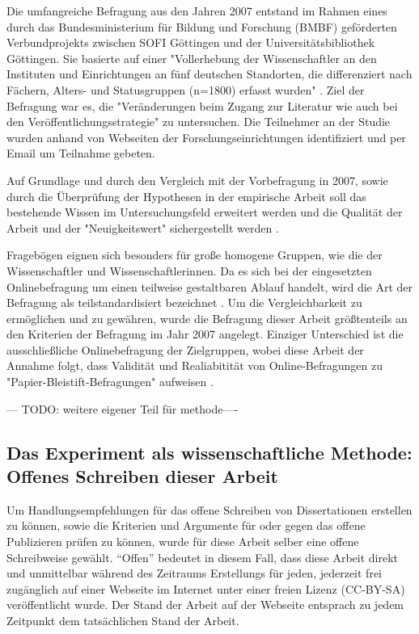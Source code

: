 Die umfangreiche Befragung aus den Jahren 2007 entstand im Rahmen eines durch das Bundesministerium für Bildung und Forschung (BMBF) geförderten Verbundprojekts zwischen SOFI Göttingen und der Universitätsbibliothek Göttingen. Sie basierte auf einer "Vollerhebung der Wissenschaftler an den Instituten und Einrichtungen an fünf deutschen Standorten, die differenziert nach Fächern, Alters- und Statusgruppen (n=1800) erfasst wurden" \cite{Hanekop_2014}. Ziel der Befragung war es, die "Veränderungen beim Zugang zur Literatur wie auch bei den Veröffentlichungsstrategie" \cite{Hanekop_Wittke_2007_Fragebogen} zu untersuchen. Die Teilnehmer an der Studie wurden anhand von Webseiten der Forschungseinrichtungen identifiziert und per Email um Teilnahme gebeten.

Auf Grundlage und durch den Vergleich mit der Vorbefragung in 2007, sowie durch die Überprüfung der Hypothesen in der empirische Arbeit soll das bestehende Wissen im Untersuchungsfeld erweitert werden und die Qualität der Arbeit und der "Neuigkeitswert" sichergestellt werden \cite{raab_2012_fragebogen}.

Fragebögen eignen sich besonders für große homogene Gruppen, wie die der Wissenschaftler und Wissenschaftlerinnen. Da es sich bei der eingesetzten Onlinebefragung um einen teilweise gestaltbaren Ablauf handelt, wird die Art der Befragung als teilstandardisiert bezeichnet \cite{raab_2012_fragebogen}. Um die Vergleichbarkeit zu ermöglichen und zu gewähren, wurde die Befragung dieser Arbeit größtenteils an den Kriterien der Befragung im Jahr 2007 angelegt. Einziger Unterschied ist die ausschließliche Onlinebefragung der Zielgruppen, wobei diese Arbeit der Annahme folgt, dass Validität und Realiabitität von Online-Befragungen zu "Papier-Bleistift-Befragungen" aufweisen \cite{Batinic_2013_onlinebefrag}.

--- TODO: weitere eigener Teil für methode----

\subsection{Das Experiment als wissenschaftliche Methode: Offenes Schreiben dieser Arbeit}

Um Handlungsempfehlungen für das offene Schreiben von Dissertationen erstellen zu können, sowie die Kriterien und Argumente für oder gegen das offene Publizieren prüfen zu können, wurde für diese Arbeit selber eine offene Schreibweise gewählt. “Offen” bedeutet in diesem Fall, dass diese Arbeit direkt und unmittelbar während des Zeitraums Erstellungs für jeden, jederzeit frei zugänglich auf einer Webseite im Internet unter einer freien Lizenz (CC-BY-SA) veröffentlicht wurde. Der Stand der Arbeit auf der Webseite entsprach zu jedem Zeitpunkt dem tatsächlichen Stand der Arbeit.

